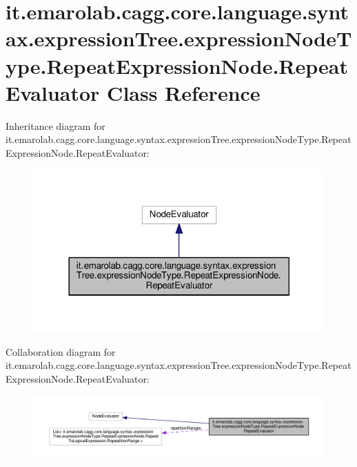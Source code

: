 \hypertarget{classit_1_1emarolab_1_1cagg_1_1core_1_1language_1_1syntax_1_1expressionTree_1_1expressionNodeTyp785488d13bbbabc8bec5d8852bfc23de}{\section{it.\-emarolab.\-cagg.\-core.\-language.\-syntax.\-expression\-Tree.\-expression\-Node\-Type.\-Repeat\-Expression\-Node.\-Repeat\-Evaluator Class Reference}
\label{classit_1_1emarolab_1_1cagg_1_1core_1_1language_1_1syntax_1_1expressionTree_1_1expressionNodeTyp785488d13bbbabc8bec5d8852bfc23de}
}


Inheritance diagram for it.\-emarolab.\-cagg.\-core.\-language.\-syntax.\-expression\-Tree.\-expression\-Node\-Type.\-Repeat\-Expression\-Node.\-Repeat\-Evaluator\-:\nopagebreak
\begin{figure}[H]
\begin{center}
\leavevmode
\includegraphics[width=320pt]{classit_1_1emarolab_1_1cagg_1_1core_1_1language_1_1syntax_1_1expressionTree_1_1expressionNodeTypbe3f7736006d656522ffae1c99b27dd3}
\end{center}
\end{figure}


Collaboration diagram for it.\-emarolab.\-cagg.\-core.\-language.\-syntax.\-expression\-Tree.\-expression\-Node\-Type.\-Repeat\-Expression\-Node.\-Repeat\-Evaluator\-:\nopagebreak
\begin{figure}[H]
\begin{center}
\leavevmode
\includegraphics[width=350pt]{classit_1_1emarolab_1_1cagg_1_1core_1_1language_1_1syntax_1_1expressionTree_1_1expressionNodeTypc2272f79b0a45ef5e1b36344310b32df}
\end{center}
\end{figure}

